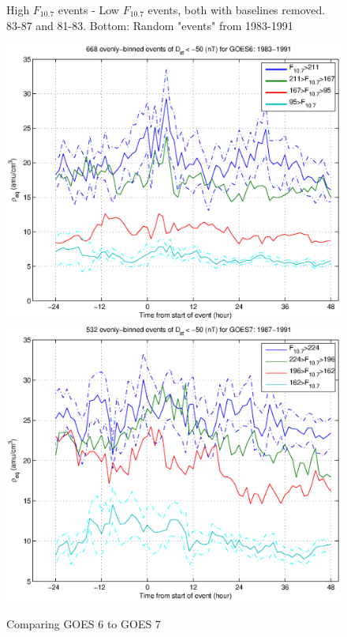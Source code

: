 \documentclass[10pt,twocolumn]{article}
\begin{document}
\begin{figure}[htp!]
\caption{High $F_{10.7}$ events - Low $F_{10.7}$ events, both with baselines removed. 83-87 and 81-83. Bottom: Random "events" from 1983-1991}
\end{figure}
\clearpage

\begin{figure}[htp!]
\includegraphics[scale=0.45]{paperfigures/HighLowF107rhoeq-Dst50-GOES6-1983-1991.eps}
\includegraphics[scale=0.45]{paperfigures/HighLowF107rhoeq-Dst50-GOES7-1987-1991.eps}
\caption{Comparing GOES 6 to GOES 7}
\end{figure}
\end{document}
